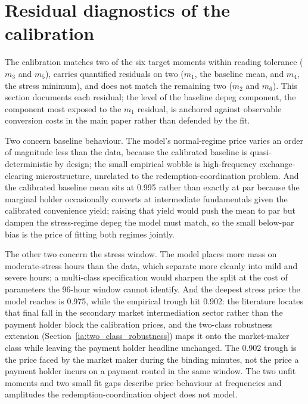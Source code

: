 \section{Residual diagnostics of the calibration}\label{sub:residual_diagnostics}\label{sub:residuals}

The calibration matches two of the six target moments within reading tolerance ($m_3$ and $m_5$), carries quantified residuals on two ($m_1$, the baseline mean, and $m_4$, the stress minimum), and does not match the remaining two ($m_2$ and $m_6$). This section documents each residual; the level of the baseline depeg component, the component most exposed to the $m_1$ residual, is anchored against observable conversion costs in the main paper rather than defended by the fit.

Two concern baseline behaviour. The model's normal-regime price varies an order of magnitude less than the data, because the calibrated baseline is quasi-deterministic by design; the small empirical wobble is high-frequency exchange-clearing microstructure, unrelated to the redemption-coordination problem. And the calibrated baseline mean sits at 0.995 rather than exactly at par because the marginal holder occasionally converts at intermediate fundamentals given the calibrated convenience yield; raising that yield would push the mean to par but dampen the stress-regime depeg the model must match, so the small below-par bias is the price of fitting both regimes jointly.

The other two concern the stress window. The model places more mass on moderate-stress hours than the data, which separate more cleanly into mild and severe hours; a multi-class specification would sharpen the split at the cost of parameters the 96-hour window cannot identify. And the deepest stress price the model reaches is 0.975, while the empirical trough hit 0.902: the literature locates that final fall in the secondary market intermediation sector \citep{ma_zeng_zhang_2025, gorton_klee_ross_ross_vardoulakis_2026} rather than the payment holder block the calibration prices, and the two-class robustness extension (Section~\ref{ia:two_class_robustness}) maps it onto the market-maker class while leaving the payment holder headline unchanged. The 0.902 trough is the price faced by the market maker during the binding minutes, not the price a payment holder incurs on a payment routed in the same window. The two unfit moments and two small fit gaps describe price behaviour at frequencies and amplitudes the redemption-coordination object does not model.

